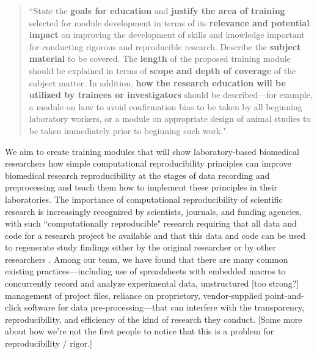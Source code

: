 \documentclass[pdftex,english,11pt,parskip=half]{scrartcl}
\begin{document}
\begin{quotation} ``State the \textbf{goals for education} and \textbf{justify
the area of training} selected for module development in terms of its
\textbf{relevance and potential impact} on improving the development of skills
and knowledge important for conducting rigorous and reproducible research.
Describe the \textbf{subject material} to be covered. The \textbf{length} of the
proposed training module should be explained in terms of \textbf{scope and depth
of coverage} of the subject matter.  In addition, \textbf{how the research
education will be utilized by trainees or investigators} should be
described---for example, a module on how to avoid confirmation bias to be taken
by all beginning laboratory workers, or a module on appropriate design of animal
studies to be taken immediately prior to beginning such work." \end{quotation}

We aim to create training modules that will show laboratory-based biomedical
researchers how simple computational reproducibility principles can improve
biomedical research reproducibility at the stages of data recording and
preprocessing and teach them how to implement these principles in their
laboratories. The importance of computational reproducibility of scientific
research is increasingly recognized by scientists, journals, and funding
agencies, with such ``computationally reproducible" research requiring that all
data and code for a research project be available and that this data and code
can be used to regenerate study findings either by the original researcher or by
other researchers \cite{ellis2017share, ram2013git}. Among our team, we have
found that there are many common existing practices---including use of
spreadsheets with embedded macros to concurrently record and analyze
experimental data, unstructured [too strong?] management of project files,
reliance on proprietory, vendor-supplied point-and-click software for data
pre-processing---that can interfere with the transparency, reproducibility, and
efficiency of the kind of research they conduct. [Some more about how we're not
the first people to notice that this is a problem for reproducibility / rigor.] 
\end{document}
